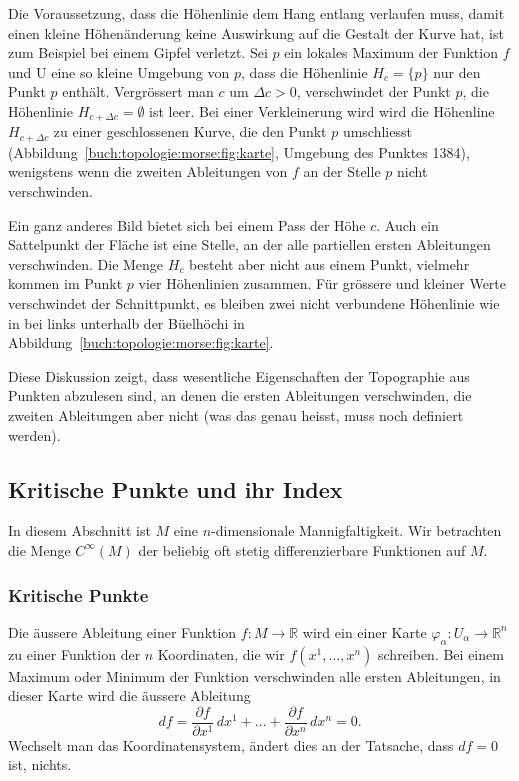 Die Voraussetzung, dass die Höhenlinie dem Hang entlang verlaufen
muss, damit einen kleine Höhenänderung keine Auswirkung auf die
Gestalt der Kurve hat, ist zum Beispiel bei einem Gipfel verletzt.
Sei $p$ ein lokales Maximum der Funktion $f$ und U eine so kleine
Umgebung von $p$, dass die Höhenlinie $H_c = \{p\}$ nur den Punkt $p$
enthält.
Vergrössert man $c$ um $\Delta c>0$, verschwindet der Punkt $p$,
die Höhenlinie $H_{c+\Delta c}=\emptyset$ ist leer.
Bei einer Verkleinerung wird wird die Höhenline $H_{c+\Delta c}$ zu
einer geschlossenen Kurve, die den Punkt $p$ umschliesst
(Abbildung~\ref{buch:topologie:morse:fig:karte}, Umgebung des Punktes 1384),
wenigstens wenn die zweiten Ableitungen von $f$ an der Stelle $p$
nicht verschwinden.

Ein ganz anderes Bild bietet sich bei einem Pass der Höhe $c$.
Auch ein Sattelpunkt der Fläche ist eine Stelle, an der
alle partiellen ersten Ableitungen verschwinden.
Die Menge $H_c$ besteht aber nicht aus einem Punkt, vielmehr
kommen im Punkt $p$ vier Höhenlinien zusammen.
Für grössere und kleiner Werte verschwindet der Schnittpunkt,
es bleiben zwei nicht verbundene Höhenlinie wie in
bei links unterhalb der Büelhöchi in
Abbildung~\ref{buch:topologie:morse:fig:karte}.

Diese Diskussion zeigt, dass wesentliche Eigenschaften der Topographie
aus Punkten abzulesen sind, an denen die ersten Ableitungen verschwinden,
die zweiten Ableitungen aber nicht (was das genau heisst, muss noch
definiert werden).

%
%
\subsection{Kritische Punkte und ihr Index}
In diesem Abschnitt ist $M$ eine $n$-dimensionale Mannigfaltigkeit.
Wir betrachten die Menge $C^\infty(M)$ der beliebig oft stetig
differenzierbare Funktionen auf $M$.

%
%
\subsubsection{Kritische Punkte}
Die äussere Ableitung einer Funktion $f\colon M\to\mathbb{R}$ 
wird ein einer Karte $\varphi_\alpha\colon U_\alpha\to\mathbb{R}^n$
zu einer Funktion der $n$ Koordinaten, die wir $f(x^1,\dots,x^n)$
schreiben.
Bei einem Maximum oder Minimum der Funktion verschwinden alle ersten
Ableitungen, in dieser Karte wird die äussere Ableitung
\[
df
=
\frac{\partial f}{\partial x^1}\,dx^1
+
\dots
+
\frac{\partial f}{\partial x^n}\,dx^n
=
0.
\]
Wechselt man das Koordinatensystem, ändert dies an der Tatsache, dass
$df=0$ ist, nichts.

